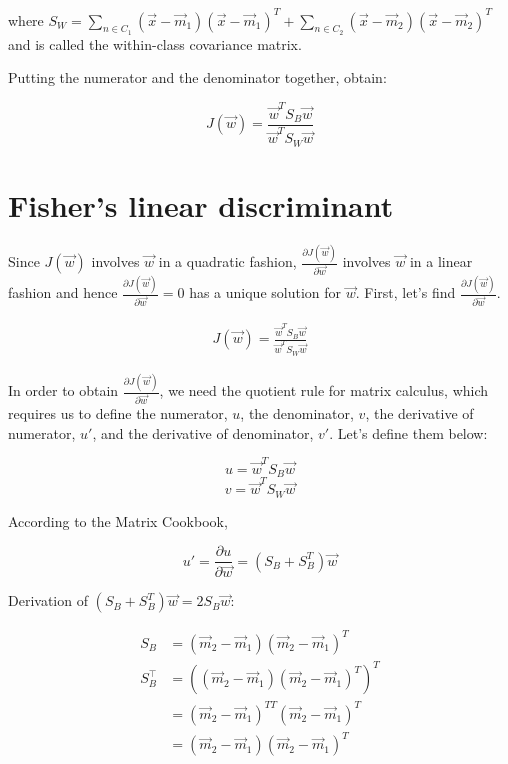 \documentclass[12pt]{article}
\newcommand\w{\vec{w}}
\newcommand\wt{\vec{w}^T}
\newcommand\msb{S_B}
\newcommand\msw{S_W}
\begin{document}
	where $S_W= \sum_{n \in C_1}  (\vec{x} - \vec{m}_1) (\vec{x} - \vec{m}_1)^T+
	\sum_{n \in C_2}  (\vec{x} - \vec{m}_2) (\vec{x} - \vec{m}_2)^T$  and is called the within-class covariance matrix.
	
	Putting the numerator and the denominator together, obtain:
	
	$$J(\vec{w}) = \frac{\vec{w}^T S_B \vec{w}}{\vec{w}^T S_W \vec{w}}$$
		
	\section{Fisher's linear discriminant}
	
	Since $J(\vec{w})$ involves $\vec{w}$ in a quadratic fashion, 
	$\frac
	{\partial J(\vec{w})}
	{\partial \vec{w}}
	$
	involves $\vec{w}$ in a linear fashion and hence 
	$\frac
	{\partial J(\vec{w})}
	{\partial \vec{w}} = 0
	$
	has a unique solution for $\vec{w}$. First, let's find 
	$\frac
	{\partial J(\vec{w})}
	{\partial \vec{w}}
	$.
	
	\begin{align}
		J(\w) = \frac{\wt \msb \w}{\wt \msw \w}
	\end{align}
	
	In order to obtain 
	$\frac
	{\partial J(\vec{w})}
	{\partial \vec{w}}
	$, 
	we need the quotient rule for matrix calculus, which requires us to define the numerator, $u$, the denominator, $v$, the derivative of numerator, $u'$, and the derivative of denominator, $v'$. Let's define them below:
	
	$$u = \wt \msb \w$$
	$$v = \wt \msw \w$$
	
	According to the Matrix Cookbook,
	
	$$u' = \frac{\partial u}{\partial \vec{w}} = (\msb + \msb^T) \w$$
	
	Derivation of $(\msb + \msb^T) \w = 2\msb\w$:
	
	$$
	\begin{aligned} 
	S_{B} &=\left(\vec{m}_{2}-\vec{m}_{1}\right)\left(\vec{m}_{2}-\vec{m}_{1}\right)^{T} \\ 
	S_{B}^{\top} &= \left( \left(\vec{m}_2-\vec{m}_{1}\right)\left(\vec{m}_{2}-\vec{m}_{1}\right)^{T} \right)^T \\ 
	&=\left(\vec{m}_{2}-\vec{m}_{1}\right)^{T T}\left(\vec{m}_2-\vec{m}_{1}\right)^{T} \\ &=\left(\vec{m}_{2}-\vec{m}_{1}\right)\left(\vec{m}_{2}-\vec{m}_{1}\right)^{T} \\ 
    \end{aligned}
	$$
	
\end{document}
